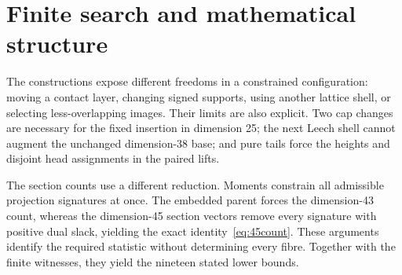 \section{Finite search and mathematical structure}\label{sec:research}
The constructions expose different freedoms in a constrained configuration:
moving a contact layer, changing signed supports, using another lattice
shell, or selecting less-overlapping images. Their limits are also
explicit. Two cap changes are necessary for the fixed insertion in
dimension 25; the next Leech shell cannot augment the unchanged
dimension-38 base; and pure tails force the heights and disjoint head
assignments in the paired lifts.

The section counts use a different reduction. Moments constrain all
admissible projection signatures at once. The embedded parent forces
the dimension-43 count, whereas the dimension-45 section vectors remove
every signature with positive dual slack, yielding the exact
identity~\eqref{eq:45count}. These arguments identify the required
statistic without determining every fibre. Together with the finite
witnesses, they yield the nineteen stated lower bounds.
